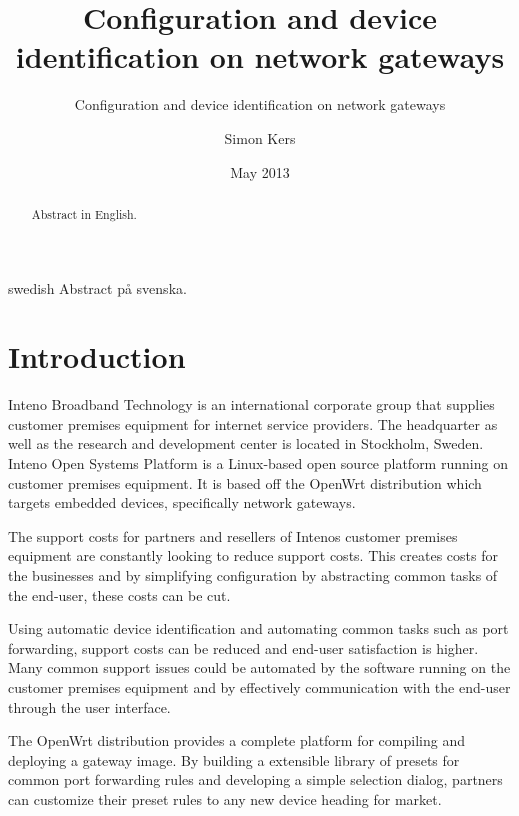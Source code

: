 \documentclass[a4paper,11pt]{kth-mag}
\title{Configuration and device identification on network gateways}
\subtitle{Configuration and device identification on network gateways}
\author{Simon Kers}
\date{May 2013}
\begin{document}
\frontmatter
\pagestyle{empty}
\removepagenumbers
\maketitle
{}
\begin{abstract}
   Abstract in English.

\end{abstract}
\clearpage
\begin{foreignabstract}{swedish}
   Abstract på svenska.

\end{foreignabstract}
\clearpage
\tableofcontents*
\mainmatter
\pagestyle{newchap}
\chapter{Introduction}
Inteno Broadband Technology is an international corporate group that supplies customer premises equipment for internet service providers.  
The headquarter as well as the research and development center is located in Stockholm, Sweden.  
Inteno Open Systems Platform is a Linux-based open source platform running on
customer premises equipment.
It is based off the OpenWrt distribution which targets embedded devices, specifically network gateways. \cite{Inteno}

The support costs for partners and resellers of Intenos customer premises equipment are constantly looking to reduce support costs. 
This creates costs for the businesses and by simplifying configuration by abstracting common tasks of the end-user, these costs can be cut.

Using automatic device identification and automating common tasks such as port forwarding, support costs can be reduced and end-user satisfaction is higher.
Many common support issues could be automated by the software running on the customer premises equipment and by effectively communication with the end-user through the user interface.

The OpenWrt distribution provides a complete platform for compiling and deploying a gateway image.
By building a extensible library of presets for common port forwarding rules and developing a simple selection dialog, partners can customize their preset rules to any new device heading for market.
\end{document}
